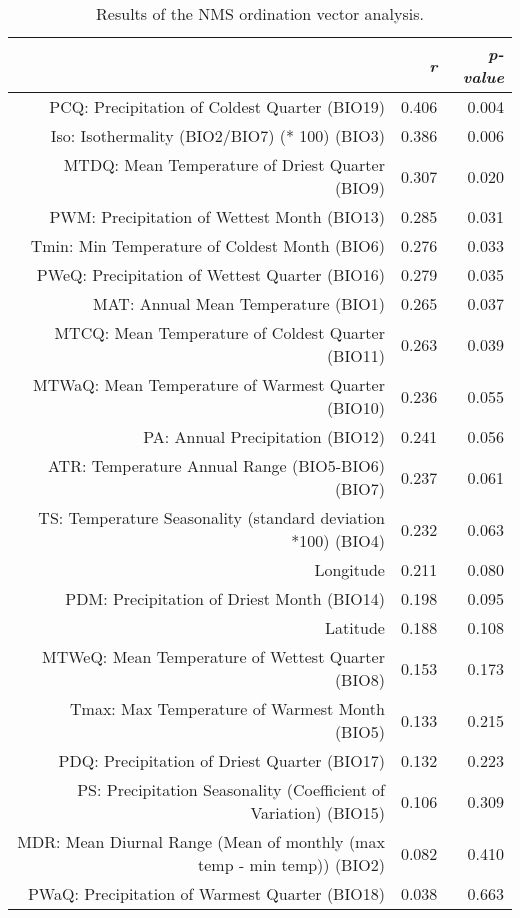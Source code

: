 \begin{table}[ht]
\centering
\begin{tabular}{rrr}
  \hline
 & {\emph{r}} & {\emph{p-value}} \\ 
  \hline
PCQ: Precipitation of Coldest Quarter (BIO19) & 0.406 & 0.004 \\ 
  Iso: Isothermality (BIO2/BIO7) (* 100) (BIO3) & 0.386 & 0.006 \\ 
  MTDQ: Mean Temperature of Driest Quarter (BIO9) & 0.307 & 0.020 \\ 
  PWM: Precipitation of Wettest Month (BIO13) & 0.285 & 0.031 \\ 
  Tmin: Min Temperature of Coldest Month (BIO6) & 0.276 & 0.033 \\ 
  PWeQ: Precipitation of Wettest Quarter (BIO16) & 0.279 & 0.035 \\ 
  MAT: Annual Mean Temperature (BIO1) & 0.265 & 0.037 \\ 
  MTCQ: Mean Temperature of Coldest Quarter (BIO11) & 0.263 & 0.039 \\ 
  MTWaQ: Mean Temperature of Warmest Quarter (BIO10) & 0.236 & 0.055 \\ 
  PA: Annual Precipitation (BIO12) & 0.241 & 0.056 \\ 
  ATR: Temperature Annual Range (BIO5-BIO6) (BIO7) & 0.237 & 0.061 \\ 
  TS: Temperature Seasonality (standard deviation *100) (BIO4) & 0.232 & 0.063 \\ 
  Longitude & 0.211 & 0.080 \\ 
  PDM: Precipitation of Driest Month (BIO14) & 0.198 & 0.095 \\ 
  Latitude & 0.188 & 0.108 \\ 
  MTWeQ: Mean Temperature of Wettest Quarter (BIO8) & 0.153 & 0.173 \\ 
  Tmax: Max Temperature of Warmest Month (BIO5) & 0.133 & 0.215 \\ 
  PDQ: Precipitation of Driest Quarter (BIO17) & 0.132 & 0.223 \\ 
  PS: Precipitation Seasonality (Coefficient of Variation) (BIO15) & 0.106 & 0.309 \\ 
  MDR: Mean Diurnal Range (Mean of monthly (max temp - min temp)) (BIO2) & 0.082 & 0.410 \\ 
  PWaQ: Precipitation of Warmest Quarter (BIO18) & 0.038 & 0.663 \\ 
   \hline
\end{tabular}
\caption{Results of the NMS ordination vector analysis.} 
\label{tab:wc_vec}
\end{table}
